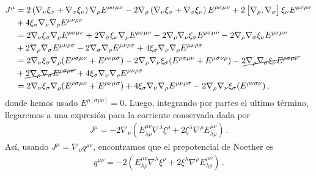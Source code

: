 \documentclass[../Main.tex]{subfiles}
\begin{document}
\begin{align}\notag
    J^{\mu}&=2\left(\nabla_\nu \xi_{\sigma}+\nabla_{\sigma} \xi_{\nu}\right) \nabla_{\rho} E^{\rho \sigma \mu\nu}-2 \nabla_{\rho}\left(\nabla_{\nu} \xi_{\sigma}+\nabla_{\sigma} \xi_{\nu}\right) E^{\rho \sigma \mu\nu}+2\left[\nabla_{\rho}, \nabla_{\sigma}\right] \xi_{\nu} E^{\mu \nu\rho \sigma}\\ \notag
    &+4 \xi_{\sigma} \nabla_{\nu} \nabla_{\rho} E^{\mu \nu \rho \sigma}\\ \notag
    &=2\nabla_\nu \xi_{\sigma}\nabla_{\rho} E^{\rho \sigma \mu\nu}+2\nabla_{\sigma} \xi_{\nu} \nabla_{\rho} E^{\rho \sigma \mu\nu}-2 \nabla_{\rho}\nabla_{\nu} \xi_{\sigma}E^{\rho \sigma \mu\nu}-2 \nabla_{\rho}\nabla_{\sigma} \xi_{\nu}E^{\rho \sigma \mu\nu}\\ \notag
    &+ 2\nabla_{\rho}\nabla_{\sigma}E^{\mu \nu \rho \sigma}-2\nabla_{\sigma}\nabla_{\rho}E^{\mu \nu \rho \sigma}+4 \xi_{\sigma} \nabla_{\nu} \nabla_{\rho} E^{\mu \nu \rho \sigma}\\ \notag
    &=2\nabla_\nu \xi_{\sigma}\nabla_{\rho}( E^{\rho \sigma \mu\nu}+E^{\rho\nu\mu\sigma})-2 \nabla_{\rho}\nabla_{\nu} \xi_{\sigma}(E^{\rho \sigma \mu\nu}+E^{\mu\sigma\nu\rho})-\cancel{2 \nabla_{\rho}\nabla_{\sigma} \xi_{\nu}E^{\rho \sigma \mu\nu}}\\ \notag
    &+ \cancel{2\nabla_{\rho}\nabla_{\sigma}E^{\rho \sigma\mu \nu }}+4 \xi_{\sigma} \nabla_{\nu} \nabla_{\rho} E^{\mu \nu \rho \sigma}\\ 
    &=2\nabla_\nu \xi_{\sigma}\nabla_{\rho}( E^{\rho \sigma \mu\nu}+E^{\rho\nu\mu\sigma})+4 \xi_{\sigma} \nabla_{\nu} \nabla_{\rho} E^{\mu \nu \rho \sigma}-2 \nabla_{\rho}\nabla_{\nu} \xi_{\sigma}(E^{\rho\nu\sigma\nu})\, ,
\end{align}
donde hemos usado $E^{\rho[\sigma\mu\nu]}=0$. Luego, integrando por partes el ultimo término, llegaremos a una expresión para la corriente conservada dada por
\begin{align}
    J^{\mu}=-2\nabla_{\nu}(E^{\mu\nu}_{\lambda\rho}\nabla^{\lambda}\xi^{\rho}+2\xi^{\lambda}\nabla^{\rho}E^{\mu\nu}_{\lambda\rho})\, .
\end{align}
Así, usando $J^{\mu}=\nabla_{\nu}q^{\mu\nu}$, encontramos que el prepotencial de Noether es 
\begin{align}
    q^{\mu\nu}=-2\left(E_{\lambda \rho}^{\mu \nu} \nabla^{\lambda }\xi^{\rho}+2 \xi^{\lambda} \nabla^{\rho} E_{\lambda \rho}^{\mu \nu}\right)\, .
\end{align}
\end{document}

